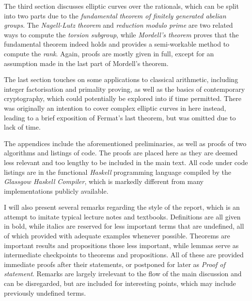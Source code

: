 \documentclass{article}
\theoremstyle{definition}\newtheorem*{definition}{Definition}
\theoremstyle{definition}\newtheorem*{example}{Example}
\theoremstyle{definition}\newtheorem*{remark}{Remark}
\begin{document}
The third section discusses elliptic curves over the rationals, which can be split into two parts due to the \emph{fundamental theorem of finitely generated abelian groups}. The \emph{Nagell-Lutz theorem} and \emph{reduction modulo prime} are two related ways to compute the \emph{torsion subgroup}, while \emph{Mordell's theorem} proves that the fundamental theorem indeed holds and provides a semi-workable method to compute the \emph{rank}. Again, proofs are mostly given in full, except for an assumption made in the last part of Mordell's theorem.

The last section touches on some applications to classical arithmetic, including integer factorisation and primality proving, as well as the basics of contemporary cryptography, which could potentially be explored into if time permitted. There was originally an intention to cover complex elliptic curves in here instead, leading to a brief exposition of Fermat's last theorem, but was omitted due to lack of time.

The appendices include the aforementioned preliminaries, as well as proofs of two algorithms and listings of code. The proofs are placed here as they are deemed less relevant and too lengthy to be included in the main text. All code under code listings are in the functional \emph{Haskell} programming language compiled by the \emph{Glassgow Haskell Compiler}, which is markedly different from many implementations publicly available.

I will also present several remarks regarding the style of the report, which is an attempt to imitate typical lecture notes and textbooks. Definitions are all given in bold, while italics are reserved for less important terms that are undefined, all of which provided with adequate examples whenever possible. Theorems are important results and propositions those less important, while lemmas serve as intermediate checkpoints to theorems and propositions. All of these are provided immediate proofs after their statements, or postponed for later as \emph{Proof of \emph{statement}}. Remarks are largely irrelevant to the flow of the main discussion and can be disregarded, but are included for interesting points, which may include previously undefined terms.
\end{document}
